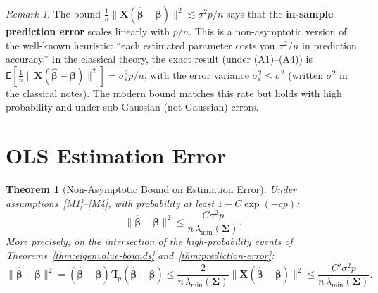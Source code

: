 \documentclass[14pt]{extarticle}
\theoremstyle{plain}
\newtheorem{theorem}{Theorem}[section]
\theoremstyle{definition}
\theoremstyle{remark}
\newtheorem*{remark}{Remark}
\newcommand\expc{\mathsf{E}}
\newcommand{\bX}{\mathbf{X}}
\def\bb{\boldsymbol{\beta}}
\newcommand{\bI}{\mathbf{I}}
\newcommand{\bSigma}{\boldsymbol{\Sigma}}
\newcommand{\hbb}{\hat{\boldsymbol{\beta}}}
\begin{document}
\begin{remark}
The bound $\frac{1}{n}\|\bX(\hbb-\bb)\|^2 \lesssim \sigma^2 p/n$ says that the \textbf{in-sample prediction error} scales linearly with $p/n$. This is a non-asymptotic version of the well-known heuristic: ``each estimated parameter costs you $\sigma^2/n$ in prediction accuracy.'' In the classical theory, the exact result (under (A1)--(A4)) is $\expc[\frac{1}{n}\|\bX(\hbb-\bb)\|^2] = \sigma_\varepsilon^2 p/n$, with the error variance $\sigma_\varepsilon^2 \leqslant \sigma^2$ (written $\sigma^2$ in the classical notes). The modern bound matches this rate but holds with high probability and under sub-Gaussian (not Gaussian) errors.
\end{remark}

\section{OLS Estimation Error}\label{sec:estimation-error}

\begin{theorem}[Non-Asymptotic Bound on Estimation Error]\label{thm:estimation-error}
Under assumptions~\ref{M1}--\ref{M4}, with probability at least $1 - C\exp(-cp)$:
\begin{equation}\label{eq:estimation-error}
\boxed{\|\hbb - \bb\|^2 \leqslant \frac{C\sigma^2 p}{n\,\lambda_{\min}(\bSigma)}.}
\end{equation}
More precisely, on the intersection of the high-probability events of Theorems~\ref{thm:eigenvalue-bounds} and~\ref{thm:prediction-error}:
\begin{equation}\label{eq:estimation-error-exact}
\|\hbb - \bb\|^2 = (\hbb - \bb)'\bI_p(\hbb - \bb) \leqslant \frac{2}{n\,\lambda_{\min}(\bSigma)}\|\bX(\hbb-\bb)\|^2 \leqslant \frac{C'\sigma^2 p}{n\,\lambda_{\min}(\bSigma)}.
\end{equation}
\end{theorem}
\end{document}
